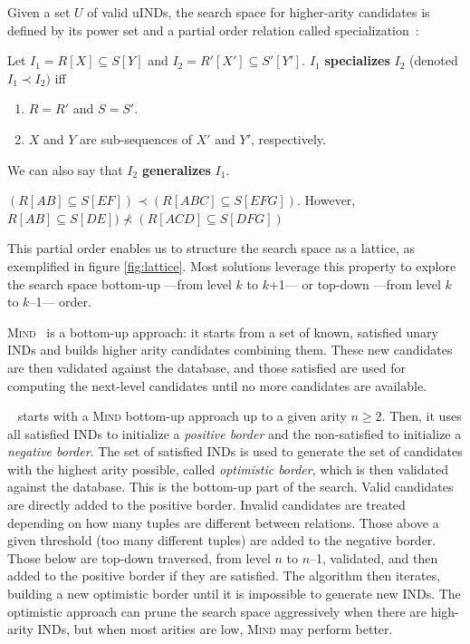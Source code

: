 Given a set $U$ of valid uINDs, the search space for
higher-arity candidates is defined by its power set and a partial order relation
called specialization~\cite{DeMarchi2002}:

\begin{definition}
    \label{def:specialization}
    Let $I_1 = R[X] \subseteq S[Y]$ and
    $I_2 = R'[X'] \subseteq S'[Y']$. $I_1$ \textbf{specializes} $I_2$ (denoted $I_1 \prec I_2)$ iff
    
    \begin{enumerate}
        \item $R = R'$ and $S = S'$.
        \item $X$ and $Y$ are sub-sequences of $X'$ and $Y'$, respectively.
    \end{enumerate}
    
    We can also say that $I_2$ \textbf{generalizes} $I_1$.
\end{definition}

\begin{example}
$(R[AB] \subseteq S[EF]) \prec (R[ABC] \subseteq S[EFG])$. However,
$R[AB] \subseteq S[DE]) \nprec (R[ACD] \subseteq S[DFG])$
\end{example}

This partial order enables us to structure the search space as a lattice, as exemplified in figure
\ref{fig:lattice}. Most solutions leverage this property to explore the search space bottom-up
---from level $k$ to $k$+1--- or top-down ---from level $k$ to $k$--1--- order.

\textsc{Mind}~\cite{DeMarchi2002} is a bottom-up approach: it starts
from a set of known, satisfied unary \glspl{IND} and builds higher arity candidates
combining them.
These new candidates are then validated against the database, and those satisfied
are used for computing the next-level candidates until no more candidates are available.

\Zigzag~\cite{DeMarchi2003zigzag} starts with a \textsc{Mind} bottom-up approach
up to a given arity $n \ge 2$. Then, it uses all satisfied \glspl{IND} to initialize a \textit{positive border}
and the non-satisfied to initialize a \textit{negative border}. The set of satisfied \glspl{IND}
is used to generate the set of candidates with the highest arity possible, called
\textit{optimistic border},
which is then validated against the database. This is the bottom-up part of the search.
Valid candidates are directly added to the positive border.
Invalid candidates are treated depending on how many tuples are different between relations.
Those above a given threshold (too many different tuples) are added to the negative border.
Those below are top-down traversed, from level $n$ to $n$--1, validated, and then added
to the positive border if they are satisfied. The algorithm then iterates, building a new
optimistic border until it is impossible to generate new \glspl{IND}. The optimistic approach
can prune the search space aggressively when there are high-arity \glspl{IND},
but when most arities are low,  \textsc{Mind} may perform better.

